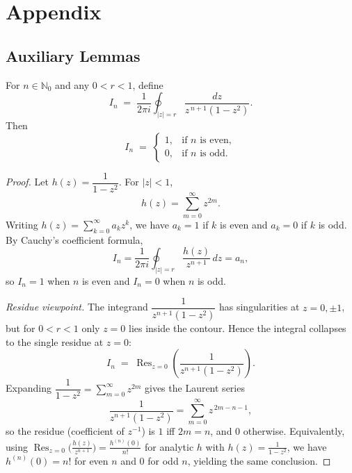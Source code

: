 \chapter{Appendix}

\section{Auxiliary Lemmas}\label{app:lemmas}

\begin{lemma}\label{lem:kronecker-even-delta}
For $n\in\mathbb{N}_0$ and any $0<r<1$, define
\[
I_n \;=\; \frac{1}{2\pi i}\oint_{|z|=r}\frac{dz}{z^{\,n+1}(1-z^2)}.
\]
Then
\[
I_n \;=\; \begin{cases}
1,& \text{if $n$ is even},\\[4pt]
0,& \text{if $n$ is odd}.
\end{cases}
\]
\begin{proof}
Let $h(z)=\dfrac{1}{1-z^2}$. For $|z|<1$,
\[
h(z)=\sum_{m=0}^{\infty} z^{2m}.
\]
Writing $h(z)=\sum_{k=0}^{\infty} a_k z^k$, we have $a_k=1$ if $k$ is even and $a_k=0$ if $k$ is odd. By Cauchy’s coefficient formula,
\[
I_n=\frac{1}{2\pi i}\oint_{|z|=r}\frac{h(z)}{z^{n+1}}\,dz=a_n,
\]
so $I_n=1$ when $n$ is even and $I_n=0$ when $n$ is odd.

\medskip
\noindent\textit{Residue viewpoint.}
The integrand $\dfrac{1}{z^{n+1}(1-z^2)}$ has singularities at $z=0,\pm1$, but for $0<r<1$ only $z=0$ lies inside the contour. Hence the integral collapses to the single residue at $z=0$:
\[
I_n \;=\; \operatorname{Res}_{z=0}\!\left(\frac{1}{z^{n+1}(1-z^2)}\right).
\]
Expanding $\dfrac{1}{1-z^2}=\sum_{m=0}^{\infty}z^{2m}$ gives the Laurent series
\[
\frac{1}{z^{n+1}(1-z^2)}=\sum_{m=0}^{\infty} z^{\,2m-n-1},
\]
so the residue (coefficient of $z^{-1}$) is $1$ iff $2m=n$, and $0$ otherwise. Equivalently, using $\operatorname{Res}_{z=0}\!\big(\frac{h(z)}{z^{n+1}}\big)=\frac{h^{(n)}(0)}{n!}$ for analytic $h$ with $h(z)=\frac{1}{1-z^2}$, we have $h^{(n)}(0)=n!$ for even $n$ and $0$ for odd $n$, yielding the same conclusion.
\end{proof}
\end{lemma}

